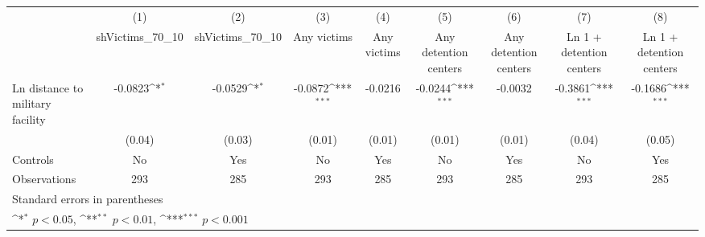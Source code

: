 {
\def\sym#1{\ifmmode^{#1}\else\(^{#1}\)\fi}
\begin{tabular}{l*{8}{c}}
\hline\hline
                    &\multicolumn{1}{c}{(1)}&\multicolumn{1}{c}{(2)}&\multicolumn{1}{c}{(3)}&\multicolumn{1}{c}{(4)}&\multicolumn{1}{c}{(5)}&\multicolumn{1}{c}{(6)}&\multicolumn{1}{c}{(7)}&\multicolumn{1}{c}{(8)}\\
                    &\multicolumn{1}{c}{shVictims\_70\_10}&\multicolumn{1}{c}{shVictims\_70\_10}&\multicolumn{1}{c}{Any victims}&\multicolumn{1}{c}{Any victims}&\multicolumn{1}{c}{Any detention centers}&\multicolumn{1}{c}{Any detention centers}&\multicolumn{1}{c}{Ln 1 + detention centers}&\multicolumn{1}{c}{Ln 1 + detention centers}\\
\hline
Ln distance to military facility&     -0.0823\sym{*}  &     -0.0529\sym{*}  &     -0.0872\sym{***}&     -0.0216         &     -0.0244\sym{***}&     -0.0032         &     -0.3861\sym{***}&     -0.1686\sym{***}\\
                    &      (0.04)         &      (0.03)         &      (0.01)         &      (0.01)         &      (0.01)         &      (0.01)         &      (0.04)         &      (0.05)         \\
[1em]
Controls            &          No         &         Yes         &          No         &         Yes         &          No         &         Yes         &          No         &         Yes         \\
\hline
Observations        &         293         &         285         &         293         &         285         &         293         &         285         &         293         &         285         \\
\hline\hline
\multicolumn{9}{l}{\footnotesize Standard errors in parentheses}\\
\multicolumn{9}{l}{\footnotesize \sym{*} \(p<0.05\), \sym{**} \(p<0.01\), \sym{***} \(p<0.001\)}\\
\end{tabular}
}
